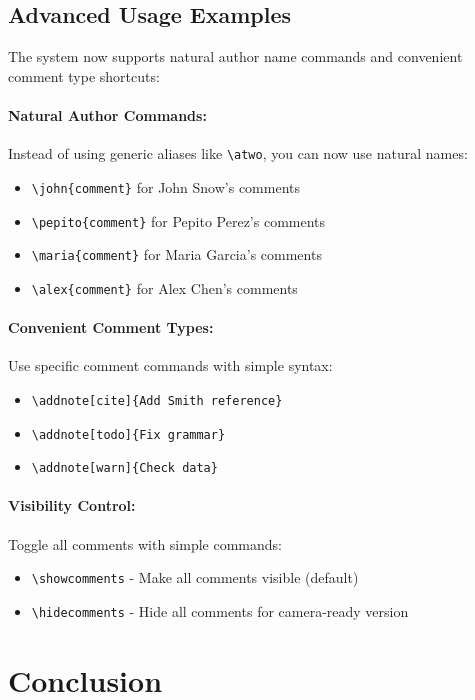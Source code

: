 \documentclass[manuscript]{acmart}
\begin{document}
\subsection{Advanced Usage Examples}

The system now supports natural author name commands and convenient comment type shortcuts:

\paragraph{Natural Author Commands:} Instead of using generic aliases like \verb|\atwo|, you can now use natural names:
\begin{itemize}
\item \verb|\john{comment}| for John Snow's comments
\item \verb|\pepito{comment}| for Pepito Perez's comments  
\item \verb|\maria{comment}| for Maria Garcia's comments
\item \verb|\alex{comment}| for Alex Chen's comments
\end{itemize}

\paragraph{Convenient Comment Types:} Use specific comment commands with simple syntax:
\begin{itemize}
\item \verb|\addnote[cite]{Add Smith reference}| 
\item \verb|\addnote[todo]{Fix grammar}| 
\item \verb|\addnote[warn]{Check data}| 
\end{itemize}

\paragraph{Visibility Control:} Toggle all comments with simple commands:
\begin{itemize}
\item \verb|\showcomments| - Make all comments visible (default)
\item \verb|\hidecomments| - Hide all comments for camera-ready version
\end{itemize}

\section{Conclusion}
\end{document}
